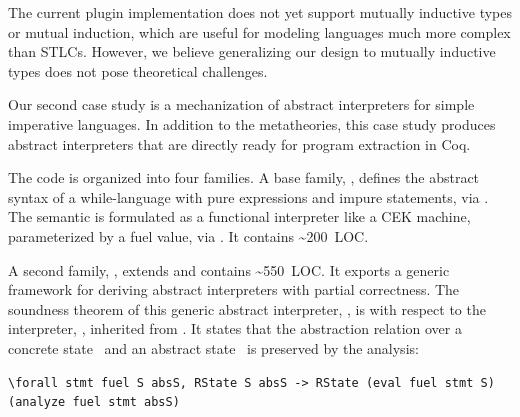 The current plugin implementation does not yet support
mutually inductive types or mutual induction, which are
useful for modeling languages much more complex than STLCs.
However,
we believe generalizing our design to mutually inductive types does
not pose theoretical challenges.



Our second case study is a mechanization of abstract interpreters
for simple imperative languages.
In addition to the metatheories, this case study produces abstract
interpreters that are directly ready for program extraction in Coq.

The code is organized into four families.
A base family, , defines the abstract syntax of a while-language
with pure expressions and impure statements, via .
The semantic is formulated as a functional interpreter like a CEK machine\cite{felleisen1986control}, parameterized by a fuel value,
via .
It contains \textasciitilde 200~LOC.

A second family, , extends  and contains
\textasciitilde 550~LOC.
It exports a generic framework for deriving
abstract interpreters with partial correctness.
The soundness theorem of this generic abstract interpreter, ,
is with respect to the interpreter, , inherited from .
It states that the abstraction relation  over a
concrete state~ and an abstract state~ is preserved
by the analysis:

\begin{centered}
\begin{minipage}{.86\textwidth}
\begin{lstlisting}[basicstyle=\fontsize{8.25}{9}\ttfamily]
\forall stmt fuel S absS, RState S absS -> RState (eval fuel stmt S) (analyze fuel stmt absS)
\end{lstlisting}
\end{minipage}
\end{centered}

